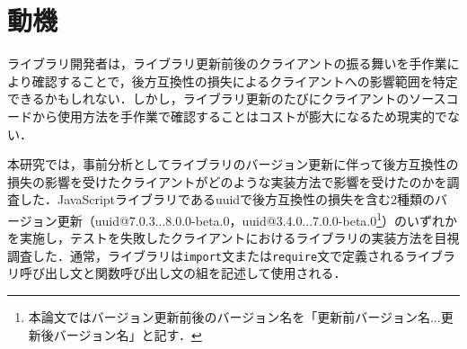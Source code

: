 \documentclass[11pt]{jreport}
\begin{document}
\section{動機}
ライブラリ開発者は，ライブラリ更新前後のクライアントの振る舞いを手作業により確認することで，後方互換性の損失によるクライアントへの影響範囲を特定できるかもしれない．しかし，ライブラリ更新のたびにクライアントのソースコードから使用方法を手作業で確認することはコストが膨大になるため現実的でない．

本研究では，事前分析としてライブラリのバージョン更新に伴って後方互換性の損失の影響を受けたクライアントがどのような実装方法で影響を受けたのかを調査した．JavaScriptライブラリであるuuidで後方互換性の損失を含む2種類のバージョン更新（uuid@7.0.3...8.0.0-beta.0，uuid@3.4.0...7.0.0-beta.0\footnote{本論文ではバージョン更新前後のバージョン名を「更新前バージョン名...更新後バージョン名」と記す．}）のいずれかを実施し，テストを失敗したクライアントにおけるライブラリの実装方法を目視調査した．通常，ライブラリは\texttt{import}文または\texttt{require}文で定義されるライブラリ呼び出し文と関数呼び出し文の組を記述して使用される．
\end{document}
